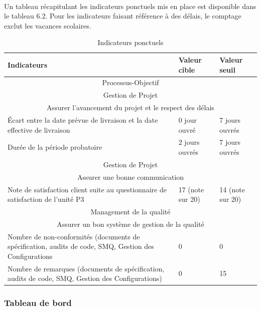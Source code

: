 \paragraph*{} Un tableau récapitulant les indicateurs ponctuels mis en place est disponible dans le tableau
6.2. Pour les indicateurs faisant référence à des délais, le comptage exclut les vacances scolaires.
\begin{table}[H]
\begin{tabular}[h]{|p{}|p{}|p{}|}
	\hline
	\rowcolor[gray]{0.85}
	Indicateurs & Valeur cible & Valeur seuil \\\hline
	\multicolumn{3}{|c|}{Processus-Objectif} \\\hline
	\multicolumn{3}{|c|}{\cellcolor[gray]{0.85} Gestion de Projet} \\
	\multicolumn{3}{|c|}{\cellcolor[gray]{0.85} Assurer l'avancement du projet et le respect des délais} \\\hline
	Écart entre la date prévue de livraison et la date effective de livraison & 0 jour ouvré & 7 jours ouvrés  \\\hline
	Durée de la période probatoire & 2 jours ouvrés & 7 jours ouvrés \\\hline
	\multicolumn{3}{|c|}{\cellcolor[gray]{0.85} Gestion de Projet} \\
	\multicolumn{3}{|c|}{\cellcolor[gray]{0.85} Assurer une bonne communication} \\\hline
	Note de satisfaction client suite au questionnaire de satisfaction de l'unité P3 & 17 (note sur 20) & 14 (note sur 20) \\\hline
	\multicolumn{3}{|c|}{\cellcolor[gray]{0.85} Management de la qualité} \\
	\multicolumn{3}{|c|}{\cellcolor[gray]{0.85} Assurer un bon système de gestion de la qualité} \\\hline
	Nombre de non-conformités (documents de spécification, audits de code, SMQ, Gestion des Configurations & 0 & 0 \\\hline
	Nombre de remarques (documents de spécification, audits de code, SMQ, Gestion des Configurations) & 0 & 15 \\\hline
	
\end{tabular}
\caption{Indicateurs ponctuels} \label{Tableau 6.2}
\end{table}

\subsubsection*{Tableau de bord}
\label{Tableau de bord}

